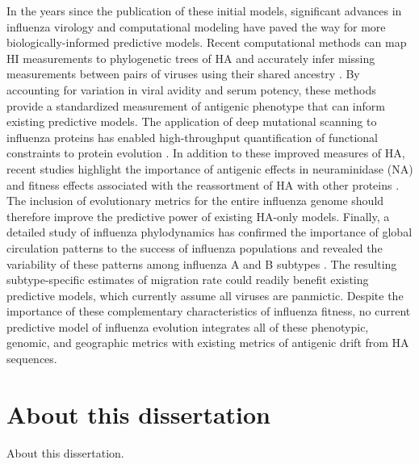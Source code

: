 In the years since the publication of these initial models, significant advances in influenza virology and computational modeling have paved the way for more biologically-informed predictive models.
Recent computational methods can map HI measurements to phylogenetic trees of HA and accurately infer missing measurements between pairs of viruses using their shared ancestry \citep{Neher:2016hy}.
By accounting for variation in viral avidity and serum potency, these methods provide a standardized measurement of antigenic phenotype that can inform existing predictive models.
The application of deep mutational scanning to influenza proteins has enabled high-throughput quantification of functional constraints to protein evolution \citep{Thyagarajan:2014go,Wu:2014ii,Doud:2016gm}.
In addition to these improved measures of HA, recent studies highlight the importance of antigenic effects in neuraminidase (NA) \citep{Chen:2018kp} and fitness effects associated with the reassortment of HA with other proteins \citep{Villa:2017iw}.
The inclusion of evolutionary metrics for the entire influenza genome should therefore improve the predictive power of existing HA-only models.
Finally, a detailed study of influenza phylodynamics has confirmed the importance of global circulation patterns to the success of influenza populations and revealed the variability of these patterns among influenza A and B subtypes \citep{Bedford:2015fj}.
The resulting subtype-specific estimates of migration rate could readily benefit existing predictive models, which currently assume all viruses are panmictic.
Despite the importance of these complementary characteristics of influenza fitness, no current predictive model of influenza evolution integrates all of these phenotypic, genomic, and geographic metrics with existing metrics of antigenic drift from HA sequences.

\section{About this dissertation}

About this dissertation.
